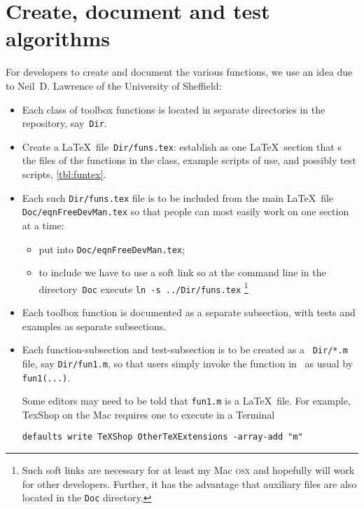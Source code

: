 \section{Create, document and test algorithms}
\label{sec:contribute}
\secttoc
\def\LaTeX{LaTeX}%

For developers to create and document the various functions, we use an idea due to Neil~D. Lawrence of the University of Sheffield:

\begin{itemize}
\item Each class of toolbox functions is located in separate directories in the repository, say~\verb|Dir|.

\item Create a \LaTeX\ file~\verb|Dir/funs.tex|: establish as one \LaTeX\ section that \verb||s the  files of the functions in the class, example scripts of use, and possibly test scripts, \autoref{tbl:funtex}.

\item Each such \verb|Dir/funs.tex| file is to be included from the main \LaTeX\ file \verb|Doc/eqnFreeDevMan.tex| so that people can most easily work on one section at a time: 
\begin{itemize}
\item put \verb|| into \verb|Doc/eqnFreeDevMan.tex|;
\item to include we have to use a soft link so at the command line in the directory~\verb|Doc| execute \verb|ln -s ../Dir/funs.tex|
\footnote{Such soft links are necessary for at least my Mac \textsc{osx} and hopefully will work for other developers.  Further, it has the advantage that auxiliary files are also located in the \texttt{Doc} directory.}
\end{itemize}


\item Each toolbox function is documented as a separate subsection, with tests and examples as separate subsections.

\item Each function-subsection and test-subsection is to be created as a \script\ \verb|Dir/*.m| file, say \verb|Dir/fun1.m|, so that users simply invoke the function in \script\ as usual by \verb|fun1(...)|.

Some editors may need to be told that \verb|fun1.m| is a \LaTeX\ file.  For example, TexShop on the Mac requires one to execute in a Terminal
\begin{verbatim}
defaults write TeXShop OtherTeXExtensions -array-add "m"
\end{verbatim}


\end{itemize}
